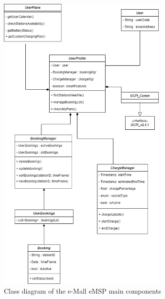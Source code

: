 \documentclass[12pt]{report}
\begin{document}
\clearpage
\begin{figure}[h]
    \centering
    \includegraphics[width = 0.75\textwidth]{assets/e-Mall EMSP.drawio (1).png}
    \caption{Class diagram of the e-Mall eMSP main components}
    \label{fig:my_label}
\end{figure}
\clearpage
\end{document}
